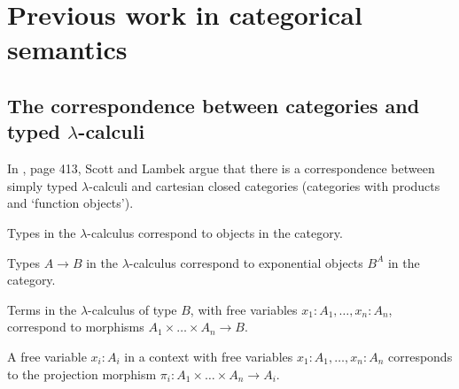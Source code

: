 \chapter{Previous work in categorical semantics}


\section{The correspondence between categories and typed \texorpdfstring{$ \lambda $}{lambda}-calculi}\label{sec:lambek-correspondence}
In \autocite{curry}, page 413, Scott and Lambek argue that there is a correspondence between simply typed $ \lambda $-calculi and cartesian closed categories (categories with products and `function objects').

Types in the $ \lambda $-calculus correspond to objects in the category.

Types $ A \to B $ in the $ \lambda $-calculus correspond to exponential objects $ B^A $ in the category.

Terms in the $ \lambda $-calculus of type $ B $, with free variables $ x_1: A_1, \dots, x_n: A_n $, correspond to morphisms $ A_1 \times \dots \times A_n \to B $.

A free variable $ x_i: A_i $ in a context with free variables $ x_1: A_1, \dots, x_n: A_n $ corresponds to the projection morphism $ \pi_i : A_1 \times \dots \times A_n \to A_i $.

